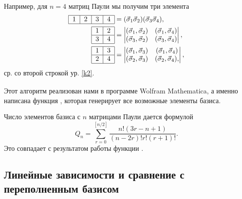 \documentclass[]{article}
\renewcommand{\[}{\begin{equation}}
\renewcommand{\]}{\end{equation}}
\begin{document}
Например, для $n=4$ матриц Паули мы получим три элемента
\begin{align}
\begin{tabular}{ |l|l|l|l| }
\hline
1 & 2 & 3 & 4 \\
\hline
\end{tabular} & = ({\vec \sigma}_1{\vec\sigma}_2)({\vec \sigma}_3{\vec\sigma}_4), \nonumber
\\
%	
\begin{tabular}{ |l|l| }
\hline
1 & 2 \\ \hline
3 & 4 \\
\hline
\end{tabular} &
=\begin{vmatrix}
(\vec\sigma_1,\vec\sigma_2) & (\vec\sigma_1,\vec\sigma_4)\\
(\vec\sigma_3,\vec\sigma_2) & (\vec\sigma_3,\vec\sigma_4)\\
\end{vmatrix}, \nonumber
\\
%
\begin{tabular}{ |l|l| }
\hline
1 & 3 \\ \hline
2 & 4 \\
\hline
\end{tabular} &
=\begin{vmatrix}
(\vec\sigma_1,\vec\sigma_3) & (\vec\sigma_1,\vec\sigma_4)\\
(\vec\sigma_2,\vec\sigma_3) & (\vec\sigma_2,\vec\sigma_4),\\
\end{vmatrix},
\nonumber
\end{align}
ср. со второй строкой ур. \eqref{k2}.


Этот алгоритм реализован нами в программе Wolfram Mathematica\textsuperscript{\textcopyright}, а именно  написана функция  \cite{basis_gen_code}, которая генерирует все возможные элементы базиса.

Число элементов базиса с $n$ матрицами Паули дается формулой \cite{sourceArticle}
$$
Q_n = \sum_{r=0}^{[n/2]}\frac{n!(3r-n+1)}{(n-2r)!r!(r+1)!}.
$$
Это совпадает с результатом работы функции \cite{basis_gen_code}.


\subsection{Линейные зависимости и сравнение с переполненным базисом}
\end{document}
